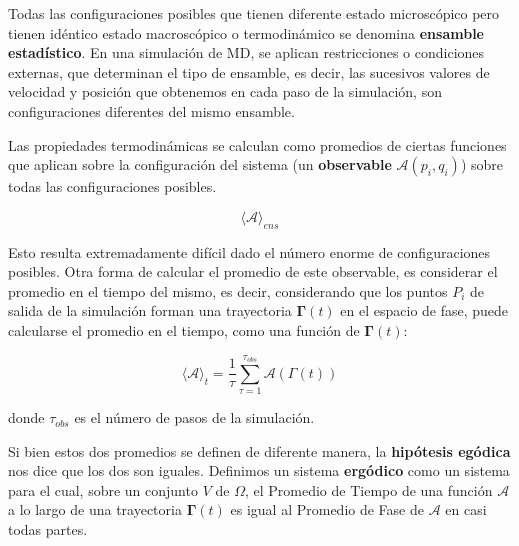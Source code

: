 Todas las configuraciones posibles que tienen diferente estado microscópico pero tienen idéntico estado macroscópico o termodinámico se denomina \textbf{ensamble estadístico}. En una simulación de MD, se aplican restricciones o condiciones externas, que determinan el tipo de ensamble, es decir, las sucesivos valores de velocidad y posición que obtenemos en cada paso de la simulación, son configuraciones diferentes del mismo ensamble.

Las propiedades termodinámicas se calculan como promedios de ciertas funciones que aplican sobre la configuración del sistema (un \textbf{observable} $\mathbf{\mathcal{A}}(p_{i},q_{i})$) sobre todas las configuraciones posibles.

\begin{equation}
\langle \mathbf{\mathcal{A}} \rangle _{ens}
\end{equation}

Esto resulta extremadamente difícil dado el número enorme de configuraciones posibles. Otra forma de calcular el promedio de este observable, es considerar el promedio en el tiempo del mismo, es decir, considerando que los puntos $P_{i}$ de salida de la simulación forman una trayectoria $\mathbf{\Gamma}(t)$ en el espacio de fase, puede calcularse el promedio en el tiempo, como una función de $\mathbf{\Gamma}(t)$:

\begin{equation}
\langle \mathbf{\mathcal{A}} \rangle _{t} = \frac{1}{\tau} \sum_{\tau = 1}^{\tau_{obs}} \mathbf{\mathcal{A}}(\Gamma (t))
\end{equation}

donde $\tau_{obs}$ es el número de pasos de la simulación.

Si bien estos dos promedios se definen de diferente manera, la \textbf{hipótesis egódica} nos dice que los dos son iguales. Definimos un sistema \textbf{ergódico} como un sistema para el cual, sobre un conjunto $V$ de $\Omega$, el Promedio de Tiempo\footnotemark{} de una función $\mathbf{\mathcal{A}}$ a lo largo de una trayectoria $\mathbf{\Gamma}(t)$ es igual al Promedio de Fase\footnotemark{} de $\mathbf{\mathcal{A}}$ en casi todas partes\footnotemark.


